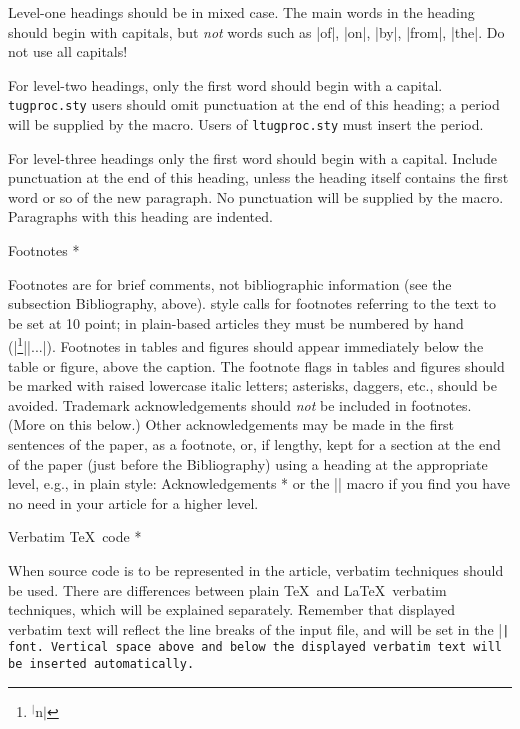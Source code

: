 \list[\lettered]
\item Level-one headings should be in mixed case.  The main
   words in the heading should begin with capitals, but {\it not\/} words
   such as |of|, |on|, |by|, |from|, |the|.  Do not use all capitals!

\item For level-two headings, only the first word should
   begin with a capital. {\tt tugproc.sty} users should omit
   punctuation at the end of this heading; a period will be supplied
   by the macro. Users of {\tt ltugproc.sty} must insert the period.

\item For level-three headings only the first word
   should begin with a capital.  Include punctuation at the end of this
   heading, unless the heading itself contains the first word or so of the
   new paragraph.  No punctuation will be supplied by the macro.
   Paragraphs with this heading are indented.
\endlist

\subhead * Footnotes *

Footnotes are for brief comments, not bibliographic information (see the
subsection Bibliography, above).  \TUB\/ style calls for footnotes
referring to the text to be set at 10 point; in plain-based articles
they must be numbered by hand
(|\footnote{$^|$n$|$}|\hskip0pt\relax|{...}|).
Footnotes in tables
and figures should appear immediately below the table or figure, above
the caption.  The footnote flags in tables and figures should be marked
with raised lowercase italic letters; asterisks, daggers, etc., should
be avoided.  Trademark acknowledgements should {\it not\/} be included in
footnotes.  (More on this below.) Other acknowledgements may be made in
the first sentences of the paper, as a footnote, or, if lengthy, kept
for a section at the end of the paper (just before the Bibliography)
using a heading at the appropriate level, e.g., in plain style:
\verbatim
\head * Acknowledgements *
\endverbatim
or the |\subhead| macro if you find you have no need in your article for
a higher level.

\subhead * Verbatim \TeX\ code *

When source code is to be represented in the article, verbatim
techniques should be used.  There are differences between plain \TeX\
and \LaTeX\ verbatim techniques, which will be explained separately.
Remember that displayed verbatim text will reflect the line breaks of
the input file, and will be set in the |\tt| font.  Vertical space above
and below the displayed verbatim text will be inserted automatically.

